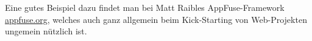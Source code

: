 Eine gutes Beispiel dazu findet man bei
Matt Raibles AppFuse-Framework \href{http://appfuse.org}{appfuse.org},
welches auch ganz allgemein beim Kick-Starting von Web-Projekten
ungemein nützlich ist.
%
%
%
%

